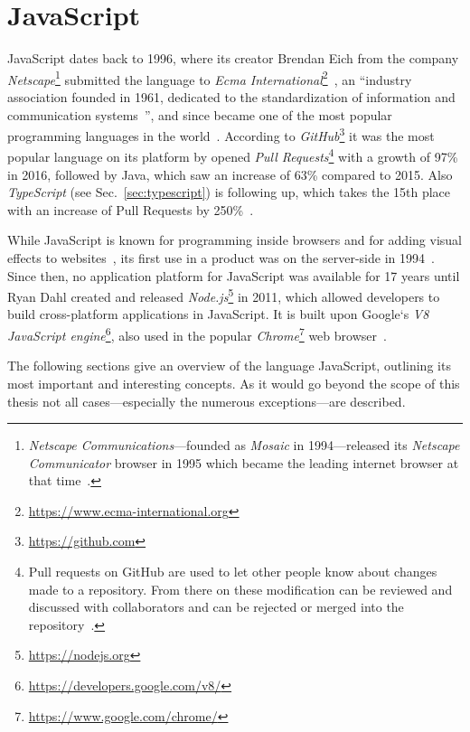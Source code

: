 \section{JavaScript}
\label{sec:javascript}

JavaScript dates back to 1996, where its creator Brendan Eich from the company \emph{Netscape}\footnote{\emph{Netscape Communications}---founded as \emph{Mosaic} in 1994---released its \emph{Netscape Communicator} browser in 1995 which became the leading internet browser at that time~\cite{HistoryOfNetscape:Cooper:2014}.} submitted the language to \emph{Ecma International}\footnote{\url{https://www.ecma-international.org}}~\cite[p.~28]{ProJavaScriptDevelopment:Odell:2014}, an ``industry association founded in 1961, dedicated to the standardization of information and communication systems~\cite{EcmaInternational:Ecma}'', and since became one of the most popular programming languages in the world~\cite[p.~2]{JavaScriptTheGoodParts:Crockford:2008}. According to \emph{GitHub}\footnote{\url{https://github.com}} it was the most popular language on its platform by opened \emph{Pull Requests}\footnote{Pull requests on GitHub are used to let other people know about changes made to a repository. From there on these modification can be reviewed and discussed with collaborators and can be rejected or merged into the repository~\cite{GitHubPullRequest:GitHub:2014}.} with a growth of 97\% in 2016, followed by Java, which saw an increase of 63\% compared to 2015. Also \emph{TypeScript} (see Sec.~\ref{sec:typescript}) is following up, which takes the 15th place with an increase of Pull Requests by 250\%~\cite{GitHubOctoverse2016:GitHub:2016}.

While JavaScript is known for programming inside browsers and for adding visual effects to websites~\cite[p.~4]{JavaScriptObjectProgramming:Rinehart:2015}, its first use in a product was on the server-side in 1994~\cite[p.~369]{ProJavaScriptDevelopment:Odell:2014}. Since then, no application platform for JavaScript was available for 17 years until Ryan Dahl created and released \emph{Node.js}\footnote{\url{https://nodejs.org}} in 2011, which allowed developers to build cross-platform applications in JavaScript. It is built upon Google`s \emph{V8 JavaScript engine}\footnote{\url{https://developers.google.com/v8/}}, also used in the popular \emph{Chrome}\footnote{\url{https://www.google.com/chrome/}} web browser~\cite[p.~369]{ProJavaScriptDevelopment:Odell:2014}.

The following sections give an overview of the language JavaScript, outlining its most important and interesting concepts. As it would go beyond the scope of this thesis not all cases---especially the numerous exceptions---are described.

